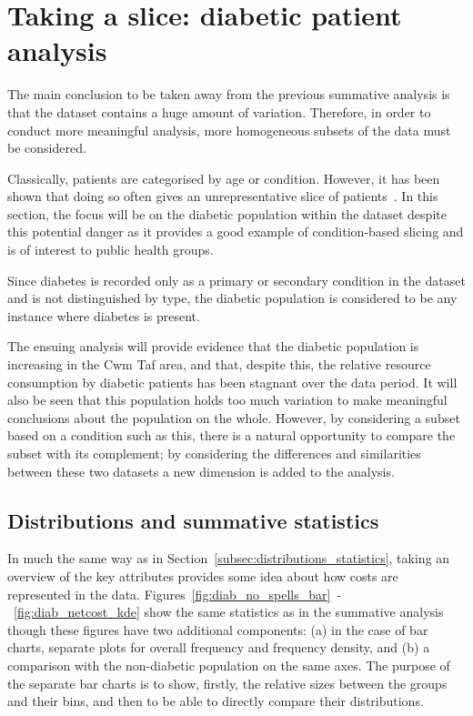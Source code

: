 \section{Taking a slice: diabetic patient analysis}\label{sec:diabetes}

The main conclusion to be taken away from the previous summative analysis is
that the dataset contains a huge amount of variation. Therefore, in order to
conduct more meaningful analysis, more homogeneous subsets of the data must be
considered.

Classically, patients are categorised by age or condition. However, it has been
shown that doing so often gives an unrepresentative slice of
patients~\cite{Vuik2016}. In this section, the focus will be on the diabetic
population within the dataset despite this potential danger as it provides a
good example of condition-based slicing and is of interest to public health
groups.

Since diabetes is recorded only as a primary or secondary condition in the
dataset and is not distinguished by type, the diabetic population is considered
to be any instance where diabetes is present.

The ensuing analysis will provide evidence that the diabetic population is
increasing in the Cwm Taf area, and that, despite this, the relative resource
consumption by diabetic patients has been stagnant over the data period. It will
also be seen that this population holds too much variation to make meaningful 
conclusions about the population on the whole. However, by considering a subset
based on a condition such as this, there is a natural opportunity to compare
the subset with its complement; by considering the differences and similarities
between these two datasets a new dimension is added to the analysis.


\subsection{Distributions and summative statistics}%
\label{subsec:diab_dists_stats}

In much the same way as in Section~\ref{subsec:distributions_statistics}, taking
an overview of the key attributes provides some idea about how costs are
represented in the data.
Figures~\ref{fig:diab_no_spells_bar}~\--~\ref{fig:diab_netcost_kde} show
the same statistics as in the summative analysis though these figures have two
additional components: (a) in the case of bar charts, separate plots for overall
frequency and frequency density, and (b) a comparison with the non-diabetic
population on the same axes. The purpose of the separate bar charts is to show,
firstly, the relative sizes between the groups and their bins, and then to be
able to directly compare their distributions.

